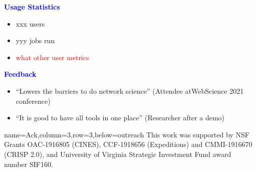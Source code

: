 \documentclass[landscape,paperwidth=70in,paperheight=46in,fontscale=0.225]{baposter} %
\begin{document}
\begin{poster}
{%
\begin{minipage}[t]{0.48 \textwidth}
\textcolor{blue}{\textbf{Usage Statistics}}
\medskip
\begin{itemize}[leftmargin=*,noitemsep,topsep=0pt]
    \item xxx users  \smallskip
    \item yyy jobs run \smallskip
    \item \textcolor{red}{what other user metrics}   \smallskip 
\end{itemize}
\end{minipage}
\quad
\begin{minipage}[t]{0.48 \textwidth}
\textcolor{blue}{\textbf{Feedback}}\
  \medskip
\begin{itemize}[leftmargin=*,noitemsep,topsep=0pt]
    \item ``Lowers the barriers to do network science'' 
     (Attendee at\newline WebScience 2021 conference)    \smallskip
    \item ``It is good to have all tools in one place'' (Researcher after a demo)
\end{itemize}
\end{minipage}
}


          {name=Ack,column=3,row=3,below=outreach}{
{\footnotesize
This work was supported by
NSF Grants OAC-1916805 (CINES),\newline
CCF-1918656 (Expeditions) and CMMI-1916670 (CRISP 2.0),
and\newline 
University of Virginia Strategic Investment Fund award
number SIF160.
}
}

\end{poster}
\end{document}
